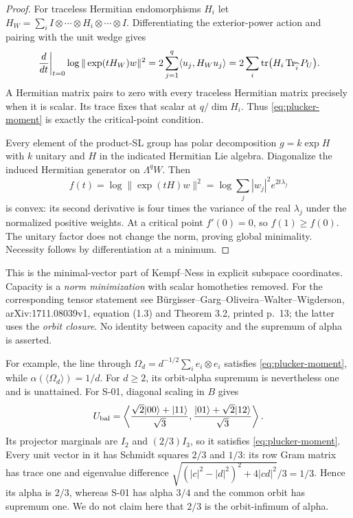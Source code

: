 \begin{proof}
For traceless Hermitian endomorphisms $H_i$ let
$H_W=\sum_i I\otimes\cdots\otimes H_i\otimes\cdots\otimes I$.
Differentiating the exterior-power action and pairing with the
unit wedge gives
\[
 \left.{d\over dt}\right|_{t=0}\log\|\exp(tH_W)w\|^2
 =2\sum_{j=1}^q\langle u_j,H_Wu_j\rangle
 =2\sum_i\operatorname{tr}\bigl(H_i\operatorname{Tr}_{\widehat i}P_U\bigr).
\]
A Hermitian matrix pairs to zero with every traceless Hermitian
matrix precisely when it is scalar. Its trace fixes that
scalar at $q/\dim H_i$. Thus \eqref{eq:plucker-moment} is
exactly the critical-point condition.

Every element of the product-SL group has polar decomposition
$g=k\exp H$ with $k$ unitary and $H$ in the indicated Hermitian
Lie algebra. Diagonalize the induced Hermitian generator on
$\Lambda^q W$. Then
\[
 f(t)=\log\|\exp(tH)w\|^2
     =\log\sum_j |w_j|^2e^{2t\lambda_j}
\]
is convex: its second derivative is four times the variance
of the real $\lambda_j$ under the normalized positive weights.
At a critical point $f'(0)=0$, so $f(1)\geq f(0)$.
The unitary factor does not change the norm, proving global
minimality. Necessity follows by differentiation at a minimum.
\end{proof}

This is the minimal-vector part of Kempf--Ness in explicit
subspace coordinates. Capacity is a \emph{norm minimization}
with scalar homotheties removed. For the corresponding tensor
statement see B\"urgisser--Garg--Oliveira--Walter--Wigderson,
arXiv:1711.08039v1, equation (1.3) and Theorem 3.2, printed p.~13;
the latter uses the \emph{orbit closure}. No identity between
capacity and the supremum of alpha is asserted.

For example, the line through
$\Omega_d=d^{-1/2}\sum_i e_i\otimes e_i$ satisfies
\eqref{eq:plucker-moment}, while $\alpha(\langle\Omega_d\rangle)=1/d$.
For $d\geq2$, its orbit-alpha supremum is nevertheless one and
is unattained. For S-01, diagonal scaling in $B$ gives
\[
 U_{\mathrm{bal}}=\left\langle
 {\sqrt2|00\rangle+|11\rangle\over\sqrt3},
 {|01\rangle+\sqrt2|12\rangle\over\sqrt3}\right\rangle.
\]
Its projector marginals are $I_2$ and $(2/3)I_3$, so it satisfies
\eqref{eq:plucker-moment}. Every unit vector in it has Schmidt
squares $2/3$ and $1/3$: its row Gram matrix has trace one and
eigenvalue difference
$\sqrt{(|c|^2-|d|^2)^2+4|cd|^2}/3=1/3$.
Hence its alpha is $2/3$, whereas S-01 has alpha $3/4$ and
the common orbit has supremum one. We do not claim here that
$2/3$ is the orbit-infimum of alpha.

